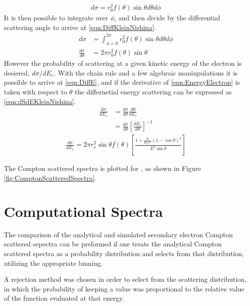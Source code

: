 \begin{align}
  \label{eqn:KleinNishinaShort}
    d\sigma = r_0^2 f(\theta)\sin\theta d\theta d\phi
\end{align}
It is then possible to integrate over $\phi$, and then divide by the differential scattering angle to arrive at \eqref{eqn:DiffKleinNishina}.
\begin{align}
  \label{eqn:DiffKleinNishina}
  d\sigma &=\int_{\phi=0}^{2\pi} r_0^2 f(\theta)\sin\theta d\theta d\phi\\
  \frac{d\sigma}{d\theta} &=2\pi r_0^2 f(\theta)\sin\theta
\end{align}
However the probability of scattering at a given kinetic energy of the electron is desiered, $d\sigma/dE_e$.
With the chain rule and a few algebraic maniupulations it is possible to arrive at \eqref{eqn:DiffE}, and if the derivative of \eqref{eqn:EnergyElectron} is taken with respect to $\theta$ the differnetial energy scattering can be expressed as \eqref{eqn:dSdEKleinNishina}.
\begin{align}
  \label{eqn:DiffE}
  \frac{d\sigma}{dE_e} & = \frac{d\sigma}{d\theta} \frac{d\theta}{dE_e} \\
   & = \frac{d\sigma}{d\theta} \left[\frac{dE_e}{d\theta}\right]^{-1} 
\end{align}
\begin{align}
  \label{eqn:dSdEKleinNishina}
\frac{d\sigma}{dE_e} = 2\pi r_e^2 \sin \theta f(\theta)\left [ \frac{1+\frac{E}{m_e c^2}\left(1-\cos\theta \right)^2}{E^2 \sin \theta} \right ]
\end{align}

The Compton scattered spectra is plotted for , as shown in Figure \ref{fig:ComptonScatteredSpectra}.

\section{Computational Spectra}
The comparison of the analytical and simulated secondary electron Compton scattered sepectra can be preformed if one treats the analytical Compton scattered spectra as a probability distribution and selects from that distribution, utilizing the appropriate binning.

A rejection method was chosen in order to select from the scattering distribution, in which the probability of keeping a value was proportional to the relative value of the function evaluated at that energy.

